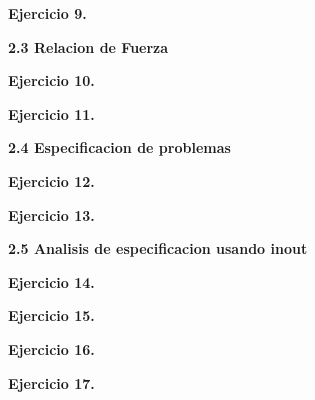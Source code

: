 \documentclass[12pt]{report}
\begin{document}
\vspace{0.8cm}
\textbf{Ejercicio 9.} 
\vspace{0.8cm}

\textbf{2.3 Relacion de Fuerza}

\vspace{0.8cm}
\textbf{Ejercicio 10.} 
\vspace{0.8cm}

\vspace{0.8cm}
\textbf{Ejercicio 11.} 
\vspace{0.8cm}

\textbf{2.4 Especificacion de problemas}

\vspace{0.8cm}
\textbf{Ejercicio 12.} 
\vspace{0.8cm}

\vspace{0.8cm}
\textbf{Ejercicio 13.} 
\vspace{0.8cm}

\textbf{2.5 Analisis de especificacion usando inout}

\vspace{0.8cm}
\textbf{Ejercicio 14.} 
\vspace{0.8cm}

\vspace{0.8cm}
\textbf{Ejercicio 15.} 
\vspace{0.8cm}

\vspace{0.8cm}
\textbf{Ejercicio 16.} 
\vspace{0.8cm}

\vspace{0.8cm}
\textbf{Ejercicio 17.} 
\vspace{0.8cm}
\end{document}
